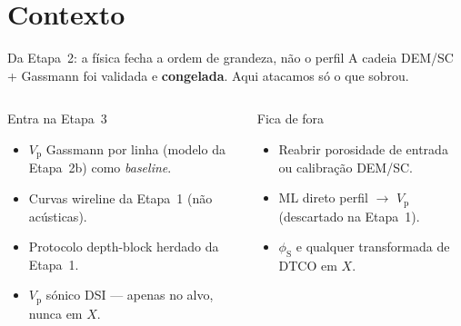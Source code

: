 \documentclass[aspectratio=169,10pt]{beamer}
\newcommand{\phiS}{\ensuremath{\phi_{\mathrm{S}}}}
\newcommand{\Vp}{\ensuremath{V_{\mathrm{p}}}}
\begin{document}
\section{Contexto}

\begin{frame}{Da Etapa~2: a física fecha a ordem de grandeza, não o perfil}
  \footnotesize
  A cadeia DEM/SC + Gassmann foi validada e \textbf{congelada}. Aqui atacamos só
  o que sobrou.
  \vspace{0.08cm}
  \begin{columns}[T,onlytextwidth]
    \begin{block}{Entra na Etapa~3}
      \scriptsize
      \begin{itemize}
        \item \Vp{} Gassmann por linha (modelo da Etapa~2b) como \emph{baseline}.
        \item Curvas wireline da Etapa~1 (não acústicas).
        \item Protocolo depth-block herdado da Etapa~1.
        \item \Vp{} sónico DSI --- apenas no alvo, nunca em $X$.
      \end{itemize}
    \end{block}
    \begin{exampleblock}{Fica de fora}
      \scriptsize
      \begin{itemize}
        \item Reabrir porosidade de entrada ou calibração DEM/SC.
        \item ML direto perfil $\rightarrow$ \Vp{} (descartado na Etapa~1).
        \item \phiS{} e qualquer transformada de DTCO em $X$.
      \end{itemize}
    \end{exampleblock}
    \centering
\end{columns}
\end{frame}
\end{document}

